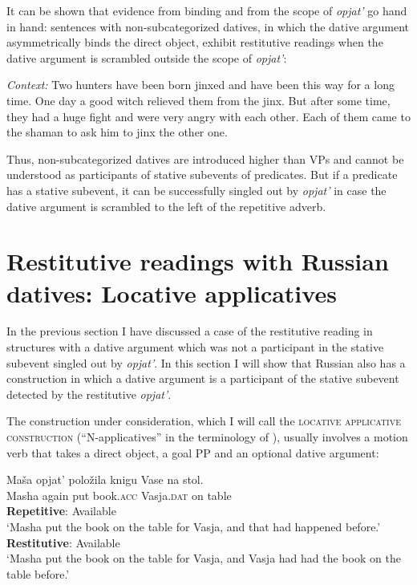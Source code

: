 \documentclass[output=paper]{langscibook}
\begin{document}
\noindent It can be shown that evidence from binding and from the scope of \textit{opjat’} go hand in hand: sentences with non-subcategorized datives, in which the dative argument asymmetrically binds the direct object, exhibit restitutive readings when the dative argument is scrambled outside the scope of \textit{opjat’}:


 \ea\label{ex:bondarenko:35}
\textit{Context:} Two hunters have been born jinxed and have been this way for a long time. One day a good witch relieved them from the jinx. But after some time, they had a huge fight and were very angry with each other. Each of them came to the shaman to ask him to jinx the other one.
\z


\noindent Thus, non-subcategorized datives are introduced higher than VPs and cannot be understood as participants of stative subevents of predicates. But if a predicate has a stative subevent, it can be successfully singled out by \textit{opjat’} in case the dative argument is scrambled to the left of the repetitive adverb.


\section{Restitutive readings with Russian datives: Locative applicatives}\label{s5}

In the previous section I have discussed a case of the restitutive reading in structures with a dative argument which was not a participant in the stative subevent singled out by \textit{opjat’}. In this section I will show that Russian also has a construction in which a dative argument is a participant of the stative subevent detected by the restitutive \textit{opjat’}.



The construction under consideration, which I will call the \textsc{locative applicative construction} (“N-applicatives” in the terminology of \citealt{Pshekhotskaya2012}), usually involves a motion verb that takes a direct object, a goal PP and an optional dative argument:\largerpage


 \ea\label{ex:bondarenko:36}
\gll Maša opjat’ položila knigu Vase na stol.\\
     Masha again put book.\textsc{acc} Vasja.\textsc{dat} on table\\
\ea \textbf{Repetitive}: Available\\
`Masha put the book on the table for Vasja, and that had   happened before.'
\ex \textbf{Restitutive}: Available\\
`Masha put the book on the table for Vasja, and Vasja had had   the book on the table before.'
\z\z
\end{document}
